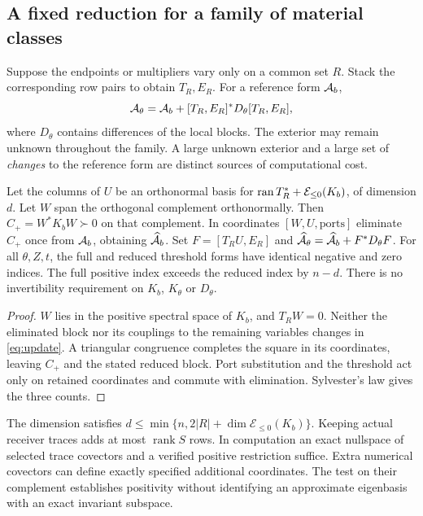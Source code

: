 \subsection{A fixed reduction for a family of material classes}
Suppose the endpoints or multipliers vary only on a common set $R$. Stack the corresponding row pairs to obtain $T_R,E_R$. For a reference form $\mathcal A_b$,
\begin{equation}
 \mathcal A_\theta=\mathcal A_b+[T_R,E_R]^*D_\theta[T_R,E_R],
 \label{eq:update}
\end{equation}
where $D_\theta$ contains differences of the local blocks. The exterior may remain unknown throughout the family. A large unknown exterior and a large set of \emph{changes} to the reference form are distinct sources of computational cost.

\begin{theorem}\label{th:fixed}
Let the columns of $U$ be an orthonormal basis for $\operatorname{ran} T_R^*+\mathcal E_{\leq0}(K_b)$, of dimension $d$. Let $W$ span the orthogonal complement orthonormally. Then $C_+=W^*K_bW\succ0$ on that complement. In coordinates $[W,U,\mathrm{ports}]$ eliminate $C_+$ once from $\mathcal A_b$, obtaining $\widehat{\mathcal A}_b$. Set $F=[T_R U,E_R]$ and $\widehat{\mathcal A}_\theta=\widehat{\mathcal A}_b+F^*D_\theta F$. For all $\theta,Z,t$, the full and reduced threshold forms have identical negative and zero indices. The full positive index exceeds the reduced index by $n-d$. There is no invertibility requirement on $K_b$, $K_\theta$ or $D_\theta$.
\end{theorem}
\begin{proof}
$W$ lies in the positive spectral space of $K_b$, and $T_R W=0$. Neither the eliminated block nor its couplings to the remaining variables changes in \eqref{eq:update}. A triangular congruence completes the square in its coordinates, leaving $C_+$ and the stated reduced block. Port substitution and the threshold act only on retained coordinates and commute with elimination. Sylvester's law gives the three counts.
\end{proof}

The dimension satisfies $d\leq\min\{n,2|R|+\dim\mathcal E_{\leq0}(K_b)\}$. Keeping actual receiver traces adds at most $\operatorname{rank} S$ rows. In computation an exact nullspace of selected trace covectors and a verified positive restriction suffice. Extra numerical covectors can define exactly specified additional coordinates. The test on their complement establishes positivity without identifying an approximate eigenbasis with an exact invariant subspace.

